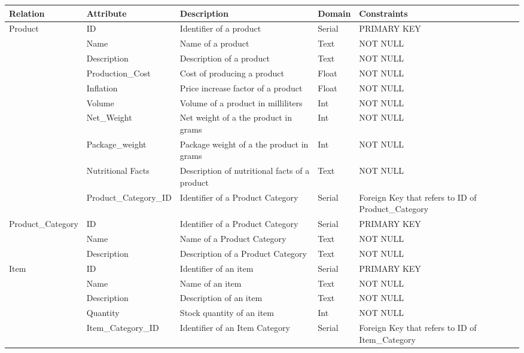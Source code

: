\begin{longtable}{|p{}|p{} |p{}|p{}|p{} |} 
\hline
\textbf{Relation} & \textbf{Attribute} & \textbf{Description} & \textbf{Domain} & \textbf{Constraints} \\\hline

\multirow{10}{*}{Product} & ID & Identifier of a product & Serial &  PRIMARY KEY\\\cline{2-5}
& Name & Name of a product & Text & NOT NULL \\\cline{2-5}
& Description & Description of a product  & Text & NOT NULL \\\cline{2-5} 
& Production\_Cost & Cost  of  producing a product & Float & NOT NULL \\\cline{2-5} 
& Inflation & Price increase factor of a product & Float & NOT NULL \\\cline{2-5} 
& Volume & Volume of a product in milliliters  & Int & NOT NULL \\\cline{2-5} 
& Net\_Weight & Net weight of a the product in grams & Int & NOT NULL \\\cline{2-5} 
& Package\_weight & Package weight of a the product in grams & Int  & NOT NULL \\\cline{2-5} 
& Nutritional Facts & Description of nutritional facts of a product & Text & NOT NULL \\\cline{2-5}
& Product\_Category\_ID & Identifier of a Product Category & Serial  & Foreign Key that refers to ID of Product\_Category \\\hline

\multirow{3}{*}{Product\_Category} & ID & Identifier of a Product Category & Serial & PRIMARY KEY \\\cline{2-5}
& Name & Name of a Product Category & Text & NOT NULL \\\cline{2-5}
& Description & Description of a Product Category & Text & NOT NULL \\\hline

\multirow{5}{*}{Item} & ID & Identifier of an item  & Serial & PRIMARY KEY \\\cline{2-5}
& Name & Name of an item & Text & NOT NULL\\\cline{2-5}
& Description & Description of an item & Text & NOT NULL \\\cline{2-5}
& Quantity & Stock quantity of an item & Int & NOT NULL \\\cline{2-5}
& Item\_Category\_ID & Identifier of an Item Category & Serial  & Foreign Key that refers to ID of Item\_Category \\\hline



\end{longtable}
